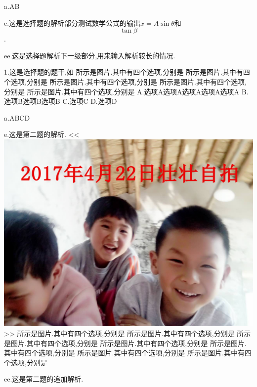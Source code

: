 \documentclass[a4paper,fontset = windowsnew]{ctexbook}
\begin{document}
\begin{choices}
  a.AB

  e.这是选择题的解析部分测试数学公式的输出$x=A\sin\theta$和\[\tan\beta\].

  ee.这是选择题解析下一级部分,用来输入解析较长的情况.

  1.这是选择题的题干,如
  所示是图片.其中有四个选项,分别是
  所示是图片.其中有四个选项,分别是
  所示是图片.其中有四个选项,分别是
  所示是图片.其中有四个选项,分别是
  所示是图片.其中有四个选项,分别是
  A.选项A选项A选项A选项A选项A
  B.选项B选项B选项B
  C.选项C
  D.选项D

  a.ABCD

  e.这是第二题的解析.
  <<
  \includegraphics[scale=0.2]{2.jpg}
  >>
  所示是图片.其中有四个选项,分别是
  所示是图片.其中有四个选项,分别是
  所示是图片.其中有四个选项,分别是
  所示是图片.其中有四个选项,分别是
  所示是图片.其中有四个选项,分别是
  所示是图片.其中有四个选项,分别是
  所示是图片.其中有四个选项,分别是

  ee.这是第二题的追加解析.


\end{choices}
\end{document}
